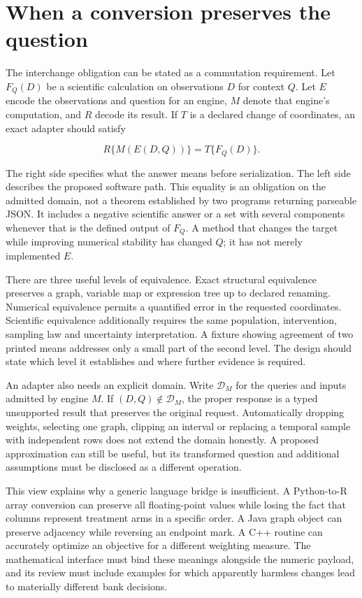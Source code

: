 \hypertarget{when-a-conversion-preserves-the-question}{%
\section{When a conversion preserves the
question}\label{when-a-conversion-preserves-the-question}}

The interchange obligation can be stated as a commutation requirement.
Let \(F_Q(D)\) be a scientific calculation on observations \(D\) for
context \(Q\). Let \(E\) encode the observations and question for an
engine, \(M\) denote that engine's computation, and \(R\) decode its
result. If \(T\) is a declared change of coordinates, an exact adapter
should satisfy

\[
 R\{M(E(D,Q))\}=T\{F_Q(D)\}.
\]

The right side specifies what the answer means before serialization. The
left side describes the proposed software path. This equality is an
obligation on the admitted domain, not a theorem established by two
programs returning parseable JSON. It includes a negative scientific
answer or a set with several components whenever that is the defined
output of \(F_Q\). A method that changes the target while improving
numerical stability has changed \(Q\); it has not merely implemented
\(E\).

There are three useful levels of equivalence. Exact structural
equivalence preserves a graph, variable map or expression tree up to
declared renaming. Numerical equivalence permits a quantified error in
the requested coordinates. Scientific equivalence additionally requires
the same population, intervention, sampling law and uncertainty
interpretation. A fixture showing agreement of two printed means
addresses only a small part of the second level. The design should state
which level it establishes and where further evidence is required.

An adapter also needs an explicit domain. Write \(\mathcal D_M\) for the
queries and inputs admitted by engine \(M\). If
\((D,Q)\notin\mathcal D_M\), the proper response is a typed unsupported
result that preserves the original request. Automatically dropping
weights, selecting one graph, clipping an interval or replacing a
temporal sample with independent rows does not extend the domain
honestly. A proposed approximation can still be useful, but its
transformed question and additional assumptions must be disclosed as a
different operation.

This view explains why a generic language bridge is insufficient. A
Python-to-R array conversion can preserve all floating-point values
while losing the fact that columns represent treatment arms in a
specific order. A Java graph object can preserve adjacency while
reversing an endpoint mark. A C++ routine can accurately optimize an
objective for a different weighting measure. The mathematical interface
must bind these meanings alongside the numeric payload, and its review
must include examples for which apparently harmless changes lead to
materially different bank decisions.

